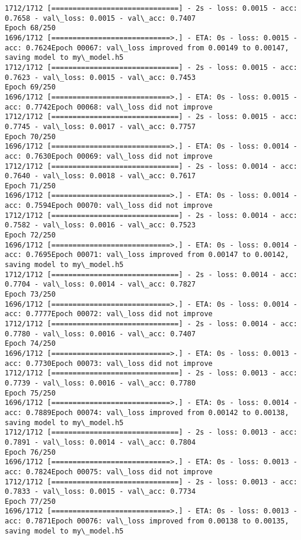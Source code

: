 \documentclass[11pt]{article}
\begin{document}
\begin{Verbatim}[commandchars=\\\{\}]
1712/1712 [==============================] - 2s - loss: 0.0015 - acc: 0.7658 - val\_loss: 0.0015 - val\_acc: 0.7407
Epoch 68/250
1696/1712 [============================>.] - ETA: 0s - loss: 0.0015 - acc: 0.7624Epoch 00067: val\_loss improved from 0.00149 to 0.00147, saving model to my\_model.h5
1712/1712 [==============================] - 2s - loss: 0.0015 - acc: 0.7623 - val\_loss: 0.0015 - val\_acc: 0.7453
Epoch 69/250
1696/1712 [============================>.] - ETA: 0s - loss: 0.0015 - acc: 0.7742Epoch 00068: val\_loss did not improve
1712/1712 [==============================] - 2s - loss: 0.0015 - acc: 0.7745 - val\_loss: 0.0017 - val\_acc: 0.7757
Epoch 70/250
1696/1712 [============================>.] - ETA: 0s - loss: 0.0014 - acc: 0.7630Epoch 00069: val\_loss did not improve
1712/1712 [==============================] - 2s - loss: 0.0014 - acc: 0.7640 - val\_loss: 0.0018 - val\_acc: 0.7617
Epoch 71/250
1696/1712 [============================>.] - ETA: 0s - loss: 0.0014 - acc: 0.7594Epoch 00070: val\_loss did not improve
1712/1712 [==============================] - 2s - loss: 0.0014 - acc: 0.7582 - val\_loss: 0.0016 - val\_acc: 0.7523
Epoch 72/250
1696/1712 [============================>.] - ETA: 0s - loss: 0.0014 - acc: 0.7695Epoch 00071: val\_loss improved from 0.00147 to 0.00142, saving model to my\_model.h5
1712/1712 [==============================] - 2s - loss: 0.0014 - acc: 0.7704 - val\_loss: 0.0014 - val\_acc: 0.7827
Epoch 73/250
1696/1712 [============================>.] - ETA: 0s - loss: 0.0014 - acc: 0.7777Epoch 00072: val\_loss did not improve
1712/1712 [==============================] - 2s - loss: 0.0014 - acc: 0.7780 - val\_loss: 0.0016 - val\_acc: 0.7407
Epoch 74/250
1696/1712 [============================>.] - ETA: 0s - loss: 0.0013 - acc: 0.7730Epoch 00073: val\_loss did not improve
1712/1712 [==============================] - 2s - loss: 0.0013 - acc: 0.7739 - val\_loss: 0.0016 - val\_acc: 0.7780
Epoch 75/250
1696/1712 [============================>.] - ETA: 0s - loss: 0.0014 - acc: 0.7889Epoch 00074: val\_loss improved from 0.00142 to 0.00138, saving model to my\_model.h5
1712/1712 [==============================] - 2s - loss: 0.0013 - acc: 0.7891 - val\_loss: 0.0014 - val\_acc: 0.7804
Epoch 76/250
1696/1712 [============================>.] - ETA: 0s - loss: 0.0013 - acc: 0.7824Epoch 00075: val\_loss did not improve
1712/1712 [==============================] - 2s - loss: 0.0013 - acc: 0.7833 - val\_loss: 0.0015 - val\_acc: 0.7734
Epoch 77/250
1696/1712 [============================>.] - ETA: 0s - loss: 0.0013 - acc: 0.7871Epoch 00076: val\_loss improved from 0.00138 to 0.00135, saving model to my\_model.h5

\end{Verbatim}
\end{document}
